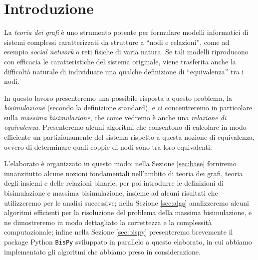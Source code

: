 \section{Introduzione}
La \emph{teoria dei grafi} è uno strumento potente per formulare modelli informatici di sistemi complessi caratterizzati da strutture a ``nodi e relazioni'', come ad esempio \emph{social network} o reti fisiche di varia natura. Se tali modelli riproducono con efficacia le caratteristiche del sistema originale, viene trasferita anche la difficoltà naturale di individuare una qualche definizione di ``equivalenza'' tra i nodi.

In questo lavoro presenteremo una possibile risposta a questo problema, la \emph{bisimulazione} (secondo la definizione standard), e ci concentreremo in particolare sulla \emph{massima bisimulazione}, che come vedremo è anche una \emph{relazione di equivalenza}. Presenteremo alcuni algoritmi che consentono di calcolare in modo efficiente un partizionamente del sistema rispetto a questa nozione di equivalenza, ovvero di determinare quali coppie di nodi sono tra loro equivalenti.

L'elaborato è organizzato in questo modo: nella Sezione \ref{sec:base} forniremo innanzitutto alcune nozioni fondamentali nell'ambito di teoria dei grafi, teoria degli insiemi e delle relazioni binarie, per poi introdurre le definizioni di bisimulazione e massima bisimulazione, insieme ad alcuni risultati che utilizzeremo per le analisi successive; nella Sezione \ref{sec:algs} analizzeremo alcuni algoritmi efficienti per la risoluzione del problema della massima bisimulazione, e ne dimostreremo in modo dettagliato la correttezza e la complessità computazionale; infine nella Sezione \ref{sec:bispy} presenteremo brevemente il package Python \texttt{BisPy} sviluppato in parallelo a questo elaborato, in cui abbiamo implementato gli algoritmi che abbiamo preso in considerazione.
